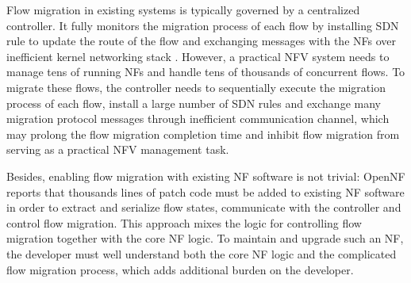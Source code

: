 Flow migration in existing systems \cite{rajagopalan2013split, gember2015opennf} is typically governed by a centralized controller. It fully monitors the migration process of each flow by installing SDN rule to update the route of the flow and exchanging messages with the NFs over inefficient kernel networking stack \cite{netmap}. However, a practical NFV system needs to manage tens of running NFs and handle tens of thousands of concurrent flows. To migrate these flows, the controller needs to sequentially execute the migration process of each flow, install a large number of SDN rules and exchange many migration protocol messages through inefficient communication channel, which may prolong the flow migration completion time and inhibit flow migration from serving as a practical NFV management task.




Besides, enabling flow migration with existing NF software is not trivial: OpenNF \cite{gember2015opennf} reports that thousands lines of patch code must be added to existing NF software \cite{bro, squid} in order to extract and serialize flow states, communicate with the controller and control flow migration. This approach mixes the logic for controlling flow migration together with the core NF logic. To maintain and upgrade such an NF, the developer must well understand both the core NF logic and the complicated flow migration process, which adds additional burden on the developer. %

